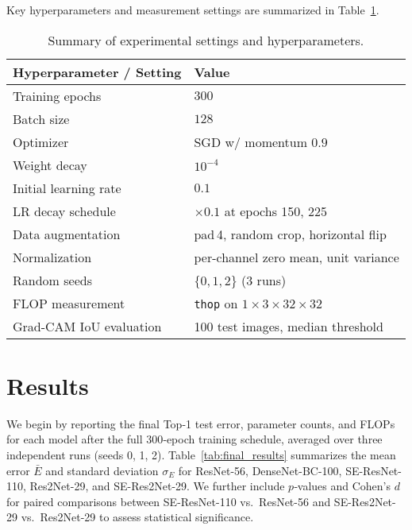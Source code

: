 \documentclass{article}
\begin{document}
Key hyperparameters and measurement settings are summarized in Table~\ref{tab:exp_settings}.

\begin{table}[h]
\centering
\begin{tabular}{l l}
\toprule
Hyperparameter / Setting           & Value                                \\
\midrule
Training epochs                    & \(300\)                              \\
Batch size                         & \(128\)                              \\
Optimizer                          & SGD w/ momentum \(0.9\)              \\
Weight decay                       & \(10^{-4}\)                          \\
Initial learning rate              & \(0.1\)                              \\
LR decay schedule                  & \(\times0.1\) at epochs 150, 225     \\
Data augmentation                  & pad\,4, random crop, horizontal flip \\
Normalization                      & per-channel zero mean, unit variance \\
Random seeds                       & \(\{0,1,2\}\) (3 runs)               \\
FLOP measurement                   & \texttt{thop} on \(1\times3\times32\times32\) \\
Grad-CAM IoU evaluation            & 100 test images, median threshold    \\
\bottomrule
\end{tabular}
\caption*{Summary of experimental settings and hyperparameters.}
\label{tab:exp_settings}
\end{table}

\section{Results}
We begin by reporting the final Top-1 test error, parameter counts, and FLOPs for each model after the full 300‐epoch training schedule, averaged over three independent runs (seeds 0, 1, 2). Table~\ref{tab:final_results} summarizes the mean error $\bar{E}$ and standard deviation $\sigma_E$ for ResNet-56, DenseNet-BC-100, SE-ResNet-110, Res2Net-29, and SE-Res2Net-29. We further include $p$‐values and Cohen’s $d$ for paired comparisons between SE-ResNet-110 vs.\ ResNet-56 and SE-Res2Net-29 vs.\ Res2Net-29 to assess statistical significance.
\end{document}

